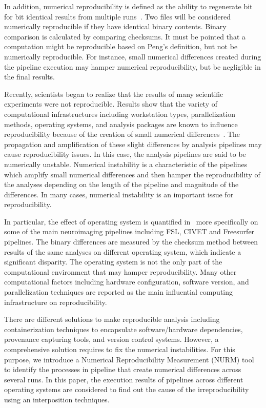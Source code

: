 \documentclass[a4paper,num-refs]{oup-contemporary}
\begin{document}
In addition, numerical reproducibility is defined as the ability to 
regenerate bit for bit identical results from multiple 
runs~\cite{hill2017numerical}. Two files will be considered numerically 
reproducible if they have identical binary contents. Binary comparison 
is calculated by comparing checksums. It must be pointed that a 
computation might be reproducible based on Peng's definition, but not 
be numerically reproducible. For instance, small numerical differences 
created during the pipeline execution may hamper numerical 
reproducibility, but be negligible in the final results.

Recently, scientists began to realize that the results of many 
scientific experiments were not reproducible. Results show that the 
variety of computational infrastructures including workstation types, 
parallelization methods, operating systems, and analysis packages are 
known to influence reproducibility because of the creation of small 
numerical differences~\cite{Gronenschild2012, diethelm2012limits, 
Glatard2015, bowring2018exploring}. The propagation and amplification 
of these slight differences by analysis pipelines may cause reproducibility 
issues. 
In this case, the analysis pipelines are said to be numerically 
unstable. Numerical instability is a characteristic of the pipelines 
which amplify small numerical differences and then hamper the 
reproducibility of the analyses depending on the length of the pipeline 
and magnitude of the differences. In many cases, numerical instability is an 
important issue for reproducibility.
 
In particular, the effect of operating system is quantified 
in~\cite{Glatard2015, Gronenschild2012} more specifically on some of 
the main neuroimaging pipelines including FSL, CIVET and Freesurfer 
pipelines. 
The binary differences are measured by the checksum method between 
results of the same analyses on different operating system, which indicate 
a significant disparity. 
The operating system is not the only part of the computational 
environment that may hamper reproducibility. Many other computational 
factors including hardware configuration, software version, and 
parallelization techniques are reported as the main influential 
computing infrastructure on reproducibility. 

There are different solutions to make reproducible analysis including 
containerization techniques to encapsulate software/hardware 
dependencies, provenance capturing tools, and version control systems. 
However, a comprehensive solution requires to fix the numerical 
instabilities. For this purpose, we introduce a Numerical 
Reproducibility Measurement (NURM) tool to identify the processes in 
pipeline that create numerical differences across several runs. In this 
paper, the execution results of pipelines across different operating 
systems are considered to find out the cause of the irreproducibility 
using an interposition techniques.
\end{document}
